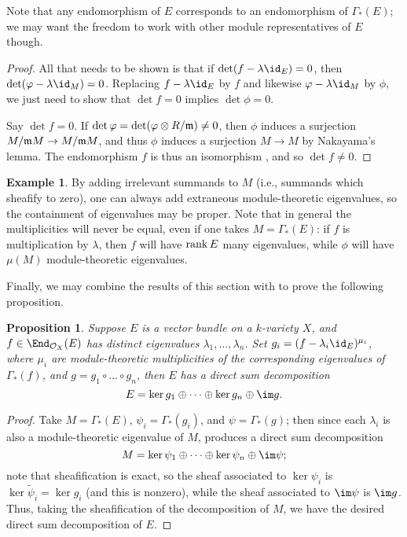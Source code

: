 \documentclass[12pt]{article}
\let\wtilde\widetilde
\def\OO{\mathcal O}
\theoremstyle{theorem}
\numberwithin{thm}{section}
\newtheorem{prop}[thm]{Proposition}
\theoremstyle{definition}
\newtheorem{exa}[thm]{Example}
\begin{document}
Note that any endomorphism of $E$ corresponds to an endomorphism of $\Gamma_*(E)$; we may want the freedom to work with other module representatives of $E$ though.

\begin{proof}
  All that needs to be shown is that if $\det(f-\lambda \id_E) =0$, then $\det(\phi-\lambda \id_M)=0$. Replacing $f-\lambda \id_E$ by $f$ and likewise $\phi-\lambda\id_M$ by $\phi$,
  we just need to show that $\det f = 0$ implies $\det\phi = 0$.

  Say $\det f = 0$. If $\det\varphi = \det(\varphi\otimes R/\mathfrak m)\neq 0$, then $\phi$ induces a surjection $M/\mathfrak m M\to M/\mathfrak m M$, and thus $\phi$ induces a surjection $M\to M$ by Nakayama's lemma. The endomorphism $f$ is thus an isomorphism \cite[Corollary~4.4]{Eisenbud95}, and so $\det f\neq 0$.
\end{proof}

\begin{exa}
  By adding irrelevant summands to $M$ (i.e., summands which sheafify to zero), one can always add extraneous module-theoretic eigenvalues, so the containment of eigenvalues may be proper.
  Note that in general the multiplicities will never be equal, even if one takes $M=\Gamma_*(E)$: if $f$ is multiplication by $\lambda$, then $f$ will have $\operatorname{rank} E$ many eigenvalues, while $\phi$ will have $\mu(M)$ module-theoretic eigenvalues.
\end{exa}

Finally, we may combine the results of this section with  to prove the following proposition.

\begin{prop}
  Suppose $E$ is a vector bundle on a $k$-variety $X$, and $f\in\End_{\OO_X}(E)$ has distinct eigenvalues $\lambda_1,\dots,\lambda_n$. Set $g_i = (f - \lambda_i\id_E)^{\mu_i}$, where $\mu_i$ are module-theoretic multiplicities of the corresponding eigenvalues of $\Gamma_*(f)$, and $g = g_1\circ\dots\circ g_n$, then $E$ has a direct sum decomposition
  \[ E = \ker g_1 \oplus \dots \oplus \ker g_n \oplus \im g. \]
\end{prop}
\begin{proof}
  Take $M = \Gamma_*(E)$, $\psi_i = \Gamma_*(g_i)$, and $\psi = \Gamma_*(g)$; then since each $\lambda_i$ is also a module-theoretic eigenvalue of $M$,  produces a direct sum decomposition
  \[ M = \ker\psi_1 \oplus \cdots \oplus \ker\psi_n \oplus \im\psi; \]
note that sheafification is exact, so the sheaf associated to $\ker \psi_i$ is $\ker \wtilde \psi_i = \ker g_i$ (and this is nonzero), while the sheaf associated to $\im \psi $ is $\im g$.
Thus, taking the sheafification of the decomposition of $M$,
we have the desired direct sum decomposition of $E$.
\end{proof}
\end{document}
